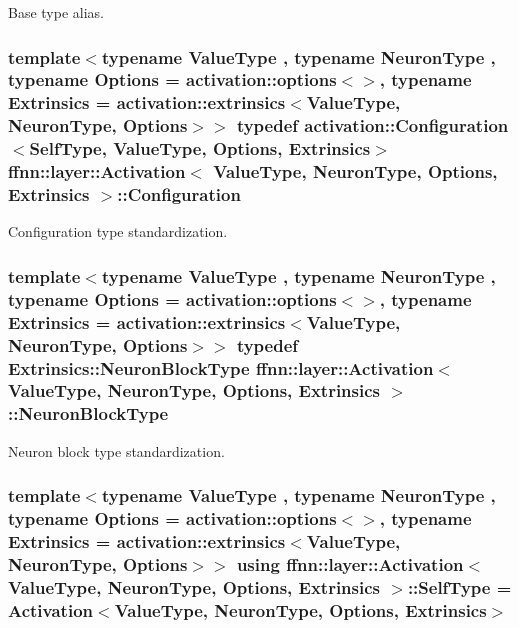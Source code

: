Base type alias. 

\hypertarget{classffnn_1_1layer_1_1_activation_ac23a5193d2f33e6aef06c8571f956fbb}{
\subsubsection[{Configuration}]{\setlength{\rightskip}{0pt plus 5cm}template$<$typename Value\-Type , typename Neuron\-Type , typename Options  = activation\-::options$<$$>$, typename Extrinsics  = activation\-::extrinsics$<$\-Value\-Type, Neuron\-Type, Options$>$$>$ typedef {\bf activation\-::\-Configuration}$<${\bf Self\-Type}, Value\-Type, Options, Extrinsics$>$ {\bf ffnn\-::layer\-::\-Activation}$<$ Value\-Type, Neuron\-Type, Options, Extrinsics $>$\-::{\bf Configuration}}}\label{classffnn_1_1layer_1_1_activation_ac23a5193d2f33e6aef06c8571f956fbb}


Configuration type standardization. 

\hypertarget{classffnn_1_1layer_1_1_activation_a782e7afdc6d76a9a4cbac43c7c36e21e}{
\subsubsection[{Neuron\-Block\-Type}]{\setlength{\rightskip}{0pt plus 5cm}template$<$typename Value\-Type , typename Neuron\-Type , typename Options  = activation\-::options$<$$>$, typename Extrinsics  = activation\-::extrinsics$<$\-Value\-Type, Neuron\-Type, Options$>$$>$ typedef Extrinsics\-::\-Neuron\-Block\-Type {\bf ffnn\-::layer\-::\-Activation}$<$ Value\-Type, Neuron\-Type, Options, Extrinsics $>$\-::{\bf Neuron\-Block\-Type}}}\label{classffnn_1_1layer_1_1_activation_a782e7afdc6d76a9a4cbac43c7c36e21e}


Neuron block type standardization. 

\hypertarget{classffnn_1_1layer_1_1_activation_aab2c75ad25e7d5cb41d6245c3d8e7469}{
\subsubsection[{Self\-Type}]{\setlength{\rightskip}{0pt plus 5cm}template$<$typename Value\-Type , typename Neuron\-Type , typename Options  = activation\-::options$<$$>$, typename Extrinsics  = activation\-::extrinsics$<$\-Value\-Type, Neuron\-Type, Options$>$$>$ using {\bf ffnn\-::layer\-::\-Activation}$<$ Value\-Type, Neuron\-Type, Options, Extrinsics $>$\-::{\bf Self\-Type} =  {\bf Activation}$<$Value\-Type, Neuron\-Type, Options, Extrinsics$>$}}\label{classffnn_1_1layer_1_1_activation_aab2c75ad25e7d5cb41d6245c3d8e7469}


